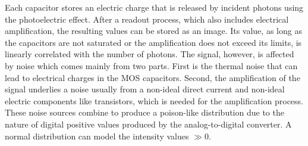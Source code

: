 Each capacitor stores an electric charge that is released by incident photons using the photoelectric effect.
After a readout process, which also includes electrical amplification, the resulting values can be stored as an image.
Its value, as long as the capacitors are not saturated or the amplification does not exceed its limits, is linearly correlated with the number of photons.
The signal, however, is affected by noise which comes mainly from two parts.
First is the thermal noise that can lead to electrical charges in the \ac{MOS} capacitors. 
Second, the amplification of the signal underlies a noise usually from a non-ideal direct current and non-ideal electric components like transistors, which is needed for the amplification process.
These noise sources combine to produce a poison-like distribution due to the nature of digital positive values produced by the analog-to-digital converter.
A normal distribution can model the intensity values $\gg 0$.
%
%
%
